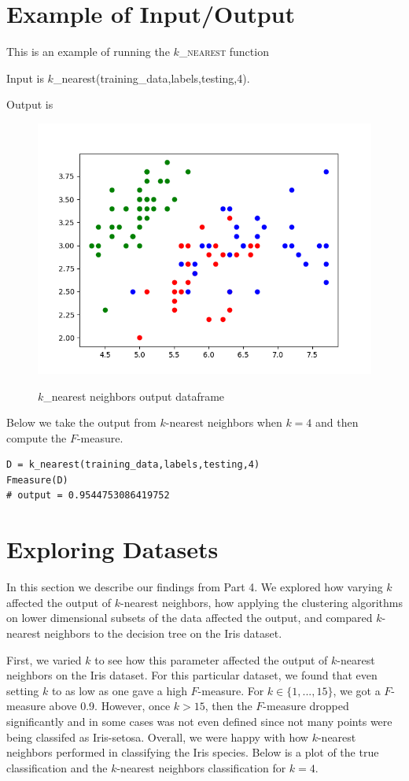 \documentclass[psamsfonts,onesided,10pt]{amsart}
\begin{document}
\section{Example of Input/Output}
\begin{description}
\item[$k$-Nearest Neighbors] This is an example of running the \textsc{$k$\_nearest} function
	\item Input is $k$\_nearest(training_data,labels,testing,4).
	\item Output is
	\begin{figure}[H]
    	\centering
    	{\includegraphics[width=.4\textwidth]{images/trueclass.png}} 
   	 \caption{$k$\_nearest neighbors output dataframe}
\end{figure}
	

\item[Decision Tree] \todo{}

\item[$k$ Fold Cross Validation] \todo{}

\item[$F$-measure] Below we take the output from $k$-nearest neighbors when $k=4$ and then compute the $F$-measure. 
\begin{verbatim}
D = k_nearest(training_data,labels,testing,4)
Fmeasure(D)
# output = 0.9544753086419752
\end{verbatim}
\end{description}

\section{Exploring Datasets}
In this section we describe our findings from Part 4. We explored how varying $k$ affected the 
output of $k$-nearest neighbors, how applying the clustering algorithms on lower dimensional 
subsets of the data affected the output, and compared $k$-nearest neighbors to the decision 
tree on the Iris dataset. 

First, we varied $k$ to see how this parameter affected the output of $k$-nearest neighbors on 
the Iris dataset. For this particular dataset, we found that even setting $k$ to as low as one gave 
a high $F$-measure. For $k\in \{1,...,15\}$, we got a $F$-measure above 0.9. However, 
once $k>15$, then the $F$-measure dropped significantly and in some cases was not even 
defined since not many points were being classifed as Iris-setosa. Overall, we were happy with 
how $k$-nearest neighbors performed in classifying the Iris species. Below is a plot of the true 
classification and the $k$-nearest neighbors classification for $k=4$. 
\end{document}
